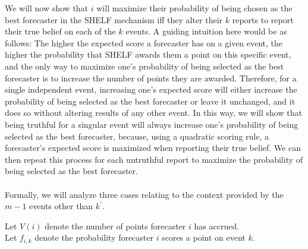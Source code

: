\documentclass[letterpaper,12pt]{article}
\newcommand{\1}{\mathbbm{1}}
\begin{document}
We will now show that $i$ will maximize their probability of being chosen as the best forecaster in the SHELF mechanism iff they alter their $k$ reports to report their true belief on each of the $k$ events. A guiding intuition here would be as follows: The higher the expected score a forecaster has on a given event, the higher the probability that SHELF awards them a point on this specific event, and the only way to maximize one's probability of being selected as the best forecaster is to increase the number of points they are awarded. Therefore, for a single independent event, increasing one's expected score will either increase the probability of being selected as the best forecaster or leave it unchanged, and it does so without altering results of any other event. In this way, we will show that being truthful for a singular event will always increase one's probability of being selected as the best forecaster, because, using a quadratic scoring rule, a forecaster's expected score is maximized when reporting their true belief. We can then repeat this process for each untruthful report to maximize the probability of being selected as the best forecaster.\\\\
Formally, we will analyze three cases relating to the context provided by the $m - 1$ events other than $k^\prime$.

Let $V(i)$ denote the number of points forecaster $i$ has accrued.\\
Let $f_{i,k}$ denote the probability forecaster $i$ scores a point on event $k$.\\
\end{document}
